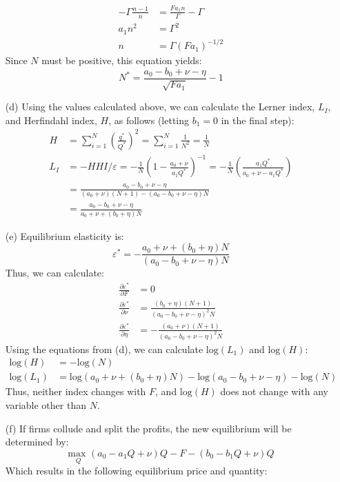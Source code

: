 \documentclass{article}
\newcommand{\loge}[1]{\text{log}\left(#1\right)}
\newcommand{\usmax}[1]{\underset{#1}{\text{max }}}
\newcommand{\pl}{\partial}
\begin{document}
\begin{itemize}
\begin{align*}
      -\Gamma\frac{n-1}{n} &= \frac{Fa_1n}{\Gamma} - \Gamma   \\
      a_1n^2 &= \Gamma^2                                      \\
      n &= \Gamma (Fa_1)^{-1/2}
    \end{align*}
    Since $N$ must be positive, this equation yields: \[
      N^* = \frac{a_0 - b_0 + \nu - \eta}{\sqrt{Fa_1}} - 1
    \]
    \item[(d)] Using the values calculated above, we can calculate the Lerner index, $L_I$, and Herfindahl index, $H$, as follows (letting ${b_1=0}$ in the final step): \begin{align*} 
      H &= \sum_{i=1}^N\left(\frac{q^*}{Q^*}\right)^2 = \sum_{i=1}^N\frac{1}{N^2} = \frac{1}{N} \\
      L_I &=  -HHI/\varepsilon = -\frac{1}{N}\left(1 - \frac{a_0 + \nu}{a_1Q^*}\right)^{-1} =  -\frac{1}{N}\left(\frac{a_1Q^*}{a_0 + \nu - a_1Q^*}\right) \\ &= \frac{a_0-b_0+\nu-\eta}{(a_0 + \nu)(N+1) - \left(a_0-b_0+\nu-\eta\right)N} \\
      &= \frac{a_0-b_0+\nu-\eta}{a_0 + \nu + (b_0 + \eta)N}
    \end{align*} 
    \item[(e)] Equilibrium elasticity is:\[
      \varepsilon^* = -\frac{a_0 + \nu + (b_0 + \eta)N}{(a_0-b_0+\nu-\eta)N}
    \]
    Thus, we can calculate:\begin{align*}
      \frac{\pl\varepsilon^*}{\pl F}    &= 0                                                \\
      \frac{\pl\varepsilon^*}{\pl \nu}  &= \frac{(b_0+\eta)(N+1)}{(a_0-b_0+\nu-\eta)^2N}   \\
      \frac{\pl\varepsilon^*}{\pl \eta} &= -\frac{(a_0+\nu)(N+1)}{(a_0-b_0+\nu-\eta)^2N}  
    \end{align*}
    Using the equations from (d), we can calculate $\loge{L_1}$ and $\loge{H}$:\begin{align*}
      \loge{H}    &= -\loge{N}  \\
      \loge{L_1}  &= \loge{a_0 + \nu + (b_0 + \eta)N} - \loge{a_0-b_0+\nu-\eta} - \loge{N}
    \end{align*}
    Thus, neither index changes with $F$, and $\loge{H}$ does not change with any variable other than $N$.
    \item[(f)] If firms collude and split the profits, the new equilibrium will be determined by: \[
      \usmax{Q}(a_0-a_1Q+\nu)Q - F - (b_0-b_1Q + \nu)Q
    \]
    Which results in the following equilibrium price and quantity:\[
\]
\end{itemize}
\end{document}
